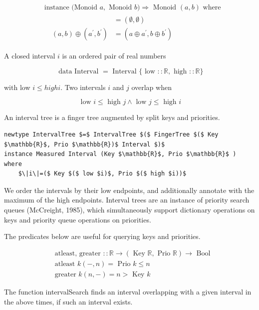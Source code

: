 \documentclass[10pt]{article}
\begin{document}
$$
\begin{aligned}
& \text { instance (Monoid } a, \text { Monoid } b) \Rightarrow \text { Monoid }(a, b) \text { where } \\
& \quad \begin{aligned}
& =(\emptyset, \emptyset) \\
(a, b) \oplus\left(a^{\prime}, b^{\prime}\right) & =\left(a \oplus a^{\prime}, b \oplus b^{\prime}\right)
\end{aligned}
\end{aligned}
$$

A closed interval $i$ is an ordered pair of real numbers

$$
\text { data Interval }=\text { Interval }\{\text { low }:: \mathbb{R}, \text { high }:: \mathbb{R}\}
$$

with low $i \leqslant h i g h i$. Two intervals $i$ and $j$ overlap when

$$
\text { low } i \leqslant \text { high } j \wedge \text { low } j \leqslant \text { high } i
$$

An interval tree is a finger tree augmented by split keys and priorities.

\begin{verbatim}
newtype IntervalTree $=$ IntervalTree $($ FingerTree $($ Key $\mathbb{R}$, Prio $\mathbb{R})$ Interval $)$
instance Measured Interval (Key $\mathbb{R}$, Prio $\mathbb{R}$ ) where
    $\|i\|=($ Key $($ low $i)$, Prio $($ high $i))$
\end{verbatim}

We order the intervals by their low endpoints, and additionally annotate with the maximum of the high endpoints. Interval trees are an instance of priority search queues (McCreight, 1985), which simultaneously support dictionary operations on keys and priority queue operations on priorities.

The predicates below are useful for querying keys and priorities.

$$
\begin{aligned}
& \text { atleast, greater }:: \mathbb{R} \rightarrow(\text { Key } \mathbb{R}, \text { Prio } \mathbb{R}) \rightarrow \text { Bool } \\
& \text { atleast } k(-, n)=\text { Prio } k \leqslant n \\
& \text { greater } k(n,-)=n>\text { Key } k
\end{aligned}
$$

The function intervalSearch finds an interval overlapping with a given interval in the above times, if such an interval exists.
\end{document}
